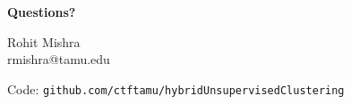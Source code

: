 \documentclass[aspectratio=169]{beamer}
\begin{document}
\begin{frame}{}
\vfill
\begin{center}
{\Huge\textbf{Questions?}}

\vspace{1cm}
{\large Rohit Mishra}\\
{\normalsize rmishra@tamu.edu}

\vspace{0.8cm}
{\footnotesize Code: \texttt{github.com/ctftamu/hybridUnsupervisedClustering}}
\end{center}
\vfill
\end{frame}
\end{document}
